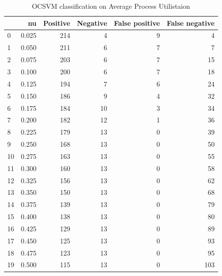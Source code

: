 \documentclass[a4paper,twoside,12pt]{book}
\begin{document}
\begin{appendices}
\begin{table}
	\centering
	\caption{OCSVM classification on Average Process Utilistaion}
	\label{id:tab:OCSVMonCombined}
	\begin{tabular}{lrrrrr}
		\toprule
		{} &     nu &  Positive &  Negative &  False positive &  False negative \\
		\midrule
		0  &  0.025 &       214 &         4 &               9 &               4 \\
		1  &  0.050 &       211 &         6 &               7 &               7 \\
		2  &  0.075 &       203 &         6 &               7 &              15 \\
		3  &  0.100 &       200 &         6 &               7 &              18 \\
		4  &  0.125 &       194 &         7 &               6 &              24 \\
		5  &  0.150 &       186 &         9 &               4 &              32 \\
		6  &  0.175 &       184 &        10 &               3 &              34 \\
		7  &  0.200 &       182 &        12 &               1 &              36 \\
		8  &  0.225 &       179 &        13 &               0 &              39 \\
		9  &  0.250 &       168 &        13 &               0 &              50 \\
		10 &  0.275 &       163 &        13 &               0 &              55 \\
		11 &  0.300 &       160 &        13 &               0 &              58 \\
		12 &  0.325 &       156 &        13 &               0 &              62 \\
		13 &  0.350 &       150 &        13 &               0 &              68 \\
		14 &  0.375 &       139 &        13 &               0 &              79 \\
		15 &  0.400 &       138 &        13 &               0 &              80 \\
		16 &  0.425 &       129 &        13 &               0 &              89 \\
		17 &  0.450 &       125 &        13 &               0 &              93 \\
		18 &  0.475 &       123 &        13 &               0 &              95 \\
		19 &  0.500 &       115 &        13 &               0 &             103 \\

\end{tabular}
\end{table}
\end{appendices}
\end{document}
